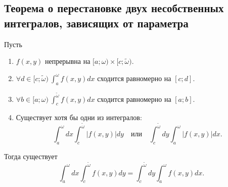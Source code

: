 \subsection{Теорема о перестановке двух несобственных интегралов, зависящих от параметра}

\begin{theorem}
    Пусть
    \begin{enumerate}
        \item $ f(x,y) $ непрерывна на $ [a;\omega)\times[c;\widetilde{\omega}) $.
        \item $ \forall d \in [c;\widetilde{\omega}) \ \int_{a}^{\omega}f(x,y)dx $ сходится равномерно на $ [c;d] $.
        \item $ \forall b \in [a;\omega) \ \int_{c}^{\widetilde{\omega}}f(x,y)dx $ сходится равномерно на $ [a;b] $.
        \item Существует хотя бы одни из интегралов:
              \[
                  \int_{a}^{\omega}dx \int_{c}^{\widetilde{\omega}}\big|f(x,y)\big|dy \quad \text{или}\quad \int_{c}^{\widetilde{\omega}}dy \int_{a}^{\omega}\big|f(x,y)\big|dx.
              \]
    \end{enumerate}

    Тогда существует
    \[
        \int_{a}^{\omega}dx \int_{c}^{\widetilde{\omega}}f(x,y)dy=\int_{c}^{\widetilde{\omega}}dy \int_{a}^{\omega}f(x,y)dx.
    \]
\end{theorem}

